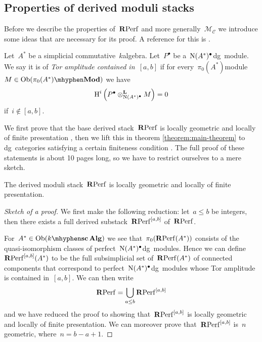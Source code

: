 \begin{refsection}
\section{Properties of derived moduli stacks}
\label{section:properties}
Before we describe the properties of~$\mathbf{R}\mathrm{Perf}$ and more generally~$\mathcal{M}_{\mathcal{C}}$ we introduce some ideas that are necessary for its proof. A reference for this is \cite[expos\'es I--III]{sga6}.
\begin{definition}
  Let~$A^*$ be a simplicial commutative~$k$\dash algebra. Let~$P^\bullet$ be a~$\operatorname{N}(A^*)^\bullet$\dash dg~module. We say it is of \emph{Tor amplitude contained in~$[a,b]$} if for every~$\pi_0(A^*)$\dash module~$M\in\Ob(\pi_0(A^*)\mhyphen\Mod)$ we have
  \begin{equation}
    \operatorname{H}^i\left( P^\bullet\otimes_{\operatorname{N}(A^*)^\bullet}^{\mathbf{L}} M \right)=0
  \end{equation}
  if~$i\notin[a,b]$.
\end{definition}

We first prove that the base derived stack~$\mathbf{R}\mathrm{Perf}$ is locally geometric and locally of finite presentation \cite[proposition 3.7]{toen-vaquie}, then we lift this in theorem \ref{theorem:main-theorem} to dg~categories satisfying a certain finiteness condition \cite[theorem 3.6]{toen-vaquie}. The full proof of these statements is about 10 pages long, so we have to restrict ourselves to a mere sketch.
\begin{theorem}
  \label{theorem:main-theorem-RPerf}
  The derived moduli stack~$\mathbf{R}\mathrm{Perf}$ is locally geometric and locally of finite presentation.

  \begin{proof}[Sketch of a proof]
    We first make the following reduction: let~$a\leq b$ be integers, then there exists a full derived substack~$\mathbf{R}\mathrm{Perf}^{[a,b]}$ of~$\mathbf{R}\mathrm{Perf}$.
    
    For~$A^*\in\Ob(\scAlg{k})$ we see that~$\pi_0(\mathbf{R}\mathrm{Perf}(A^*))$ consists of the quasi-isomorphism classes of perfect~$\operatorname{N}(A^*)^\bullet$\dash dg~modules. Hence we can define~$\mathbf{R}\mathrm{Perf}^{[a,b]}(A^*)$ to be the full subsimplicial set of~$\mathbf{R}\mathrm{Perf}(A^*)$ of connected components that correspond to perfect~$\operatorname{N}(A^*)^\bullet$\dash dg~modules whose Tor amplitude is contained in~$[a,b]$. We can then write
    \begin{equation}
      \mathbf{R}\mathrm{Perf}=\bigcup_{a\leq b}\mathbf{R}\mathrm{Perf}^{[a,b]}
    \end{equation}
    and we have reduced the proof to showing that~$\mathbf{R}\mathrm{Perf}^{[a,b]}$ is locally geometric and locally of finite presentation. We can moreover prove that~$\mathbf{R}\mathrm{Perf}^{[a,b]}$ is~$n$\dash geometric, where~$n=b-a+1$.


\end{proof}
\end{theorem}
\end{refsection}

